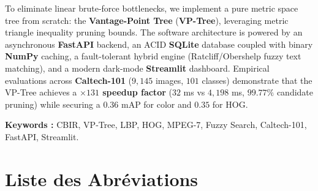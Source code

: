 \documentclass[11pt,a4paper,oneside]{report}
\theoremstyle{definition}
\begin{document}
To eliminate linear brute-force bottlenecks, we implement a pure metric space tree from scratch: the \textbf{Vantage-Point Tree} (\textbf{VP-Tree}), leveraging metric triangle inequality pruning bounds. The software architecture is powered by an asynchronous \textbf{FastAPI} backend, an ACID \textbf{SQLite} database coupled with binary \textbf{NumPy} caching, a fault-tolerant hybrid engine (Ratcliff/Obershelp fuzzy text matching), and a modern dark-mode \textbf{Streamlit} dashboard. Empirical evaluations across \textbf{Caltech-101} ($9,145$ images, $101$ classes) demonstrate that the VP-Tree achieves a \textbf{$\times 131$ speedup factor} ($32$ ms vs $4,198$ ms, $99.77\%$ candidate pruning) while securing a $0.36$ mAP for color and $0.35$ for HOG.

\vspace{0.4cm}
\textbf{Keywords :} CBIR, VP-Tree, LBP, HOG, MPEG-7, Fuzzy Search, Caltech-101, FastAPI, Streamlit.

\newpage

\tableofcontents
\newpage

\listoffigures
\vspace{0.8cm}
\listoftables
\newpage

\chapter*{Liste des Abréviations}
\end{document}
